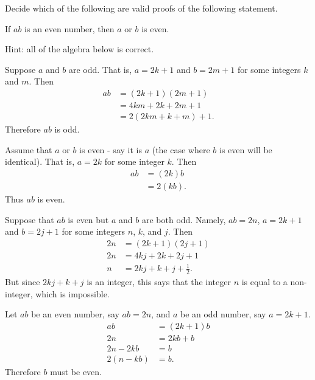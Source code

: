 \documentclass[11pt]{exam}
\begin{document}

Decide which of the following are valid proofs of the following statement.

\begin{center}
If $a b$ is an even number, then $a$ or $b$ is even.
\end{center}

Hint: all of the algebra below is correct.
\begin{questions}
\question Suppose $a$ and $b$ are odd.  That is, $a=2k+1$ and $b=2m+1$ for some integers $k$ and $m$. Then
\begin{align*}
ab &=(2k+1)(2m+1)\\
&=4km+2k+2m+1\\
&=2(2km+k+m)+1.
\end{align*}
Therefore $ab$ is odd.
\vfill

\question Assume that $a$ or $b$ is even - say it is $a$ (the case where $b$ is even will be identical). That is, $a=2k$ for some integer $k$. Then
\begin{align*}
ab &=(2k)b\\
&=2(kb).
\end{align*}
Thus $ab$ is even.
\vfill

\question Suppose that $ab$ is even but $a$ and $b$ are both odd. Namely, $ab = 2n$, $a=2k+1$ and $b=2j+1$ for some integers $n$, $k$, and $j$. Then
\begin{align*}
2n &=(2k+1)(2j+1)\\
2n &=4kj+2k+2j+1\\
n &= 2kj+k+j+\frac{1}{2}.
\end{align*}
But since $2kj+k+j$ is an integer, this says that the integer $n$ is equal to a non-integer, which is impossible.
\vfill

\question Let $ab$ be an even number, say $ab=2n$, and $a$ be an odd number, say $a=2k+1$. %
\begin{align*}
ab &=(2k+1)b\\
2n &=2kb+b\\
2n-2kb&=b\\
2(n-kb)&=b.
\end{align*}
Therefore $b$ must be even.
\end{questions}
\end{document}
